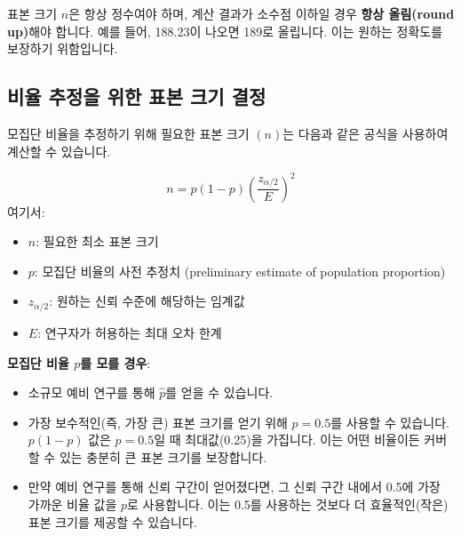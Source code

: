 \documentclass[11pt,a4paper]{article}
\theoremstyle{definition}
\begin{document}
\begin{enumerate}
\begin{enumerate}
\begin{cautionbox}
    표본 크기 \(n\)은 항상 정수여야 하며, 계산 결과가 소수점 이하일 경우 \textbf{항상 올림(round up)}해야 합니다. 예를 들어, 188.23이 나오면 189로 올립니다. 이는 원하는 정확도를 보장하기 위함입니다.
\end{cautionbox}

\subsection{비율 추정을 위한 표본 크기 결정}
모집단 비율을 추정하기 위해 필요한 표본 크기 \((n)\)는 다음과 같은 공식을 사용하여 계산할 수 있습니다.

\begin{equation*}
    n = p(1-p) \left( \frac{z_{\alpha/2}}{E} \right)^2
\end{equation*}
여기서:
\begin{itemize}
    \item \(n\): 필요한 최소 표본 크기
    \item \(p\): 모집단 비율의 사전 추정치 (preliminary estimate of population proportion)
    \item \(z_{\alpha/2}\): 원하는 신뢰 수준에 해당하는 임계값
    \item \(E\): 연구자가 허용하는 최대 오차 한계
\end{itemize}

\begin{tipbox}
    \textbf{모집단 비율 \(p\)를 모를 경우}:
    \begin{itemize}
        \item 소규모 예비 연구를 통해 \(\hat{p}\)를 얻을 수 있습니다.
        \item 가장 보수적인(즉, 가장 큰) 표본 크기를 얻기 위해 \(p = 0.5\)를 사용할 수 있습니다. \(p(1-p)\) 값은 \(p=0.5\)일 때 최대값(0.25)을 가집니다. 이는 어떤 비율이든 커버할 수 있는 충분히 큰 표본 크기를 보장합니다.
        \item 만약 예비 연구를 통해 신뢰 구간이 얻어졌다면, 그 신뢰 구간 내에서 0.5에 가장 가까운 비율 값을 \(p\)로 사용합니다. 이는 0.5를 사용하는 것보다 더 효율적인(작은) 표본 크기를 제공할 수 있습니다.
    \end{itemize}
\end{tipbox}


\end{enumerate}
\end{enumerate}
\end{document}
